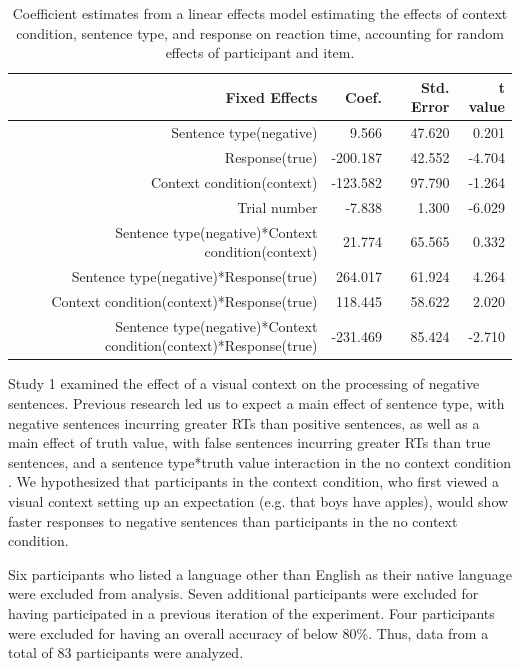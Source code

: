 \documentclass[10pt,letterpaper]{article}
\begin{document}
\begin{table}[t]
\caption{Coefficient estimates from a linear effects model estimating the effects of context condition, sentence type, and response on reaction time, accounting for random effects of participant and item.}
\begin{center}
\small\addtolength{\tabcolsep}{-5pt}
\begin{tabular}{ r  r  r  r  } 
\hline
  \bf{Fixed Effects} & \bf{Coef.} & \bf{Std. Error} & \bf{t value} \\ \hline             
Sentence type(negative) & 9.566 & 47.620 & 0.201\\
Response(true) &  -200.187 & 42.552 & -4.704\\
Context condition(context) & -123.582 & 97.790 & -1.264\\
Trial number & -7.838 & 1.300 & -6.029\\
Sentence type(negative)*Context condition(context) & 21.774 & 65.565 & 0.332\\
Sentence type(negative)*Response(true) & 264.017 & 61.924 & 4.264\\
Context condition(context)*Response(true) &  118.445 & 58.622 & 2.020\\
Sentence type(negative)*Context condition(context)*Response(true) & -231.469 & 85.424 & -2.710\\
\hline
\end{tabular}
\end{center} 
\end{table}

Study 1 examined the effect of a visual context on the processing of negative sentences.  Previous research led us to expect a main effect of sentence type, with negative sentences incurring greater RTs than positive sentences, as well as a main effect of truth value, with false sentences incurring greater RTs than true sentences, and a sentence type*truth value interaction in the no context condition \cite{hclark1972}.  We hypothesized that participants in the context condition, who first viewed a visual context setting up an expectation (e.g. that boys have apples), would show faster responses to negative sentences than participants in the no context condition.  

Six participants who listed a language other than English as their native language were excluded from analysis.  Seven additional participants were excluded for having participated in a previous iteration of the experiment.  Four participants were excluded for having an overall accuracy of below 80\%.  Thus, data from a total of 83 participants were analyzed.  
\end{document}
